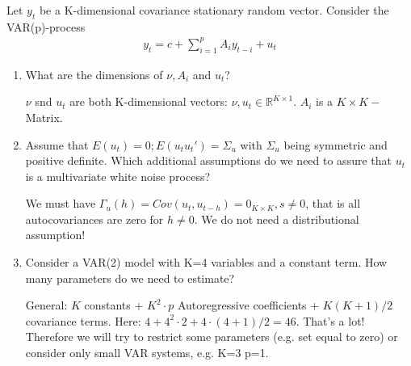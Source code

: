 Let $y_t$ be a K-dimensional covariance stationary random vector. Consider the VAR(p)-process
\begin{align*}
    y_t = c + \sum_{i=1}^p A_i {y_{t-i}} + u_t
\end{align*}
\begin{enumerate}
    \item What are the dimensions of $\nu, A_i$ and $u_{t}$?
          \begin{solution}
              $\nu$ snd $u_t$ are both K-dimensional vectors: $\nu,u_t \in \mathbb{R}^{K \times 1}$. $A_i$ is a $K \times K-$Matrix.
          \end{solution}
    \item Assume that $E(u_t) = 0; E(u_t u_t') = \Sigma_u$ with $\Sigma_u$ being symmetric and positive definite. Which additional assumptions do we need to assure that $u_t$ is a multivariate white noise process?
          \begin{solution}

              We must have ${\Gamma_u(h)} = Cov(u_t, u_{t-h}) = 0_{K\times K},s\neq0$, that is all autocovariances are zero for $h\neq0$. We do not need a distributional assumption!
          \end{solution}
    \item Consider a VAR(2) model with K=4 variables and a constant term. How many parameters do we need to estimate?
          \begin{solution}

              General: $K$ constants + $K^2\cdot p$ Autoregressive coefficients + $K(K+1)/2$ covariance terms. Here: $4+4^2\cdot2+4\cdot(4+1)/2=46$. That's a lot! Therefore we will try to restrict some parameters (e.g. set equal to zero) or consider only small VAR systems, e.g. K=3 p=1.


\end{solution}
\end{enumerate}

